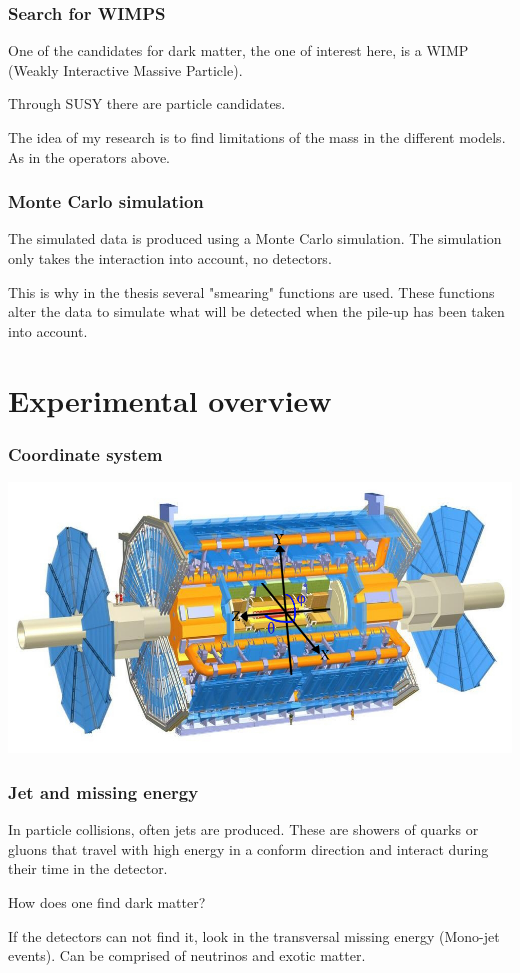 \documentclass[•]{beamer}
\theoremstyle{remark}
\begin{document}
\begin{frame}\frametitle{Search for WIMPS}
\begin{block}

One of the candidates for dark matter, the one of interest here, is a WIMP (Weakly Interactive Massive Particle). 

Through SUSY there are particle candidates. 

The idea of my research is to find limitations of the mass in the different models. As in the operators above.
\end{block}
\end{frame}
\begin{frame}\frametitle{Monte Carlo simulation}
\begin{block}

The simulated data is produced using a Monte Carlo simulation. The simulation only takes the interaction into account, no detectors. 

This is why in the thesis several "smearing" functions are used. These functions alter the data to simulate what will be detected when the pile-up has been taken into account.
\end{block}
\end{frame}
\section{Experimental overview}
\begin{frame}\frametitle{Coordinate system}
\includegraphics[scale=0.3]{particle_collider.jpg}
\end{frame}
\begin{frame}\frametitle{Jet and missing energy}
\begin{block}

In particle collisions, often jets are produced. These are showers of quarks or gluons that travel with high energy in a conform direction and interact during their time in the detector.

How does one find dark matter? 

If the detectors can not find it, look in the transversal missing energy (Mono-jet events). Can be comprised of neutrinos and exotic matter.

\end{block}
\end{frame}
\end{document}
